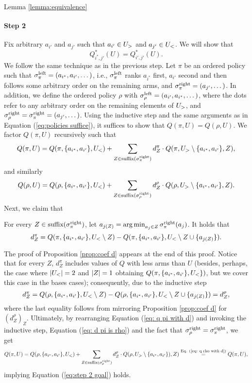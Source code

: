 \begin{proofof}{Lemma \ref{lemma:equivalence}}
\paragraph{Step 2}
Fix arbitrary $a_{i'}$ and $a_{j'}$ such that $a_{i'} \in U_>$ and $a_{j'} \in U_<$. We will show that 
\begin{equation}\label{eq:step 2 goal}
Q^*_{{i^*},{j'}}(U)=Q^*_{{i'},{j'}}(U).
\end{equation}
We follow the same technique as in the previous step. Let $\pi$ be an ordered policy such that $\sigma^{\textnormal{left}}_\pi=(a_{i^*},a_{i'},\dots )$, i.e., $\sigma^{\textnormal{left}}_\pi$ ranks $a_{i^*}$ first, $a_{i'}$ second and then follows some arbitrary order on the remaining arms, and $\sigma^{\textnormal{right}}_\pi=(a_{j'},\dots)$. In addition, we define the ordered policy $\rho$ with $\sigma^{\textnormal{left}}_\rho=(a_{i'},a_{i^*},\dots )$, where the dots refer to any arbitrary order on the remaining elements of $U_>$, and $\sigma^{\textnormal{right}}_\rho =\sigma^{\textnormal{right}}_\pi=(a_{j'},\dots)$. Using the inductive step and the same arguments as in Equation (\ref{eq:policies suffice}), it suffices to show that $Q(\pi,U)=Q(\rho,U)$. We factor $Q(\pi,U)$ recursively such that 
\begin{align}\label{eq: q pi with d}
Q(\pi,U)=Q(\pi,\{a_{i^*},a_{i'}\},U_<)+ \sum_{Z \in \textnormal{suffix}(\sigma^{\textnormal{right}}_\pi)} d^\pi_Z \cdot Q(\pi,U_> \setminus \{a_{i^*},a_{i'}\},Z),
\end{align}
and similarly
\begin{align}\label{eq: q rho with d}
Q(\rho,U)=Q(\rho,\{a_{i^*},a_{i'}\},U_<)+ \sum_{Z \in \textnormal{suffix}(\sigma^{\textnormal{right}}_\rho)} d^\rho_Z \cdot Q(\rho,U_> \setminus \{a_{i^*},a_{i'}\},Z).
\end{align}
Next, we claim that
\begin{proposition}\label{prop:coef d}
For every $Z\in \textnormal{suffix}(\sigma^{\textnormal{right}}_\pi)$, let $a_{j(Z)} = \operatorname*{arg\,min}_{a_j\in Z}\sigma^{\textnormal{right}}_\pi(a_j)$. It holds that
\[
d^\pi_Z = Q(\pi,\{a_{i^*},a_{i'}\},U_< \setminus Z )-Q(\pi,\{a_{i^*},a_{i'}\},U_< \setminus Z \cup \{a_{j(Z)}\}).
\]
\end{proposition}
The proof of Proposition \ref{prop:coef d} appears at the end of this proof. Notice that for every $Z$, $d^\pi_Z$ includes values of $Q$ with less arms than $U$ (besides, perhaps, the case where $\left| U_< \right|=2$ and $\left| Z \right|=1$ obtaining $Q(\pi,\{a_{i^*},a_{i'}\},U_<\})$, but we cover this case in the bases cases); consequently, due to the inductive step
\begin{align}\label{eq: d pi is rho}
d^\pi_Z = Q(\rho,\{a_{i^*},a_{i'}\},U_< \setminus Z )-Q(\rho,\{a_{i^*},a_{i'}\},U_< \setminus Z \cup \{a_{j(Z)}\})=d^\rho_Z,
\end{align}
where the last equality follows from mirroring Proposition \ref{prop:coef d} for $(d^\rho_Z)_Z$. Ultimately, by rearranging Equation (\ref{eq: q pi with d}) and invoking the inductive step, Equation (\ref{eq: d pi is rho}) and the fact that $\sigma^{\textnormal{right}}_\rho =\sigma^{\textnormal{right}}_\pi$, we get
\begin{align*}
Q(\pi,U)=Q(\rho,\{a_{i^*},a_{i'}\},U_<)+ \sum_{Z \in \textnormal{suffix}(\sigma^{\textnormal{right}}_\rho)} d^\rho_Z \cdot Q(\rho,U_> \setminus \{a_{i^*},a_{i'}\}),Z)\stackrel{\textnormal{Eq. (\ref{eq: q rho with d})}}{=}Q(\pi,U),
\end{align*}
implying Equation (\ref{eq:step 2 goal}) holds.

\end{proofof}
